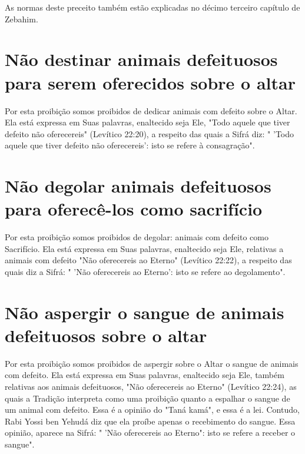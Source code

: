 \begin{itemize}
\begin{enumrate}
\begin{itemize}
\begin{itemize}
\begin{itemize}
As normas deste preceito também estão explicadas no décimo ter­ceiro
capítulo de Zebahim.

\section{Não destinar animais defeituosos para serem oferecidos sobre o altar}

Por esta proibição somos proibidos de dedicar animais com defeito sobre
o Altar. Ela está expressa em Suas palavras, enaltecido seja Ele, "Todo
aquele que tiver defeito não oferecereis" (Levítico 22:20), a respeito
das quais a Sifrá diz: " 'Todo aquele que tiver defeito não
oferecereis': isto se refere à consagração".

\section{Não degolar animais defeituosos para oferecê-los como sacrifício}

Por esta proibição somos proibidos de degolar: animais com defeito como
Sacrifício. Ela está expressa em Suas palavras, enaltecido seja Ele,
relativas a animais com defeito "Não oferecereis ao Eterno" (Levítico
22:22), a respeito das quais diz a Sifrá: " 'Não oferecereis ao Eterno':
isto se refere ao degolamento".


\section{Não aspergir o sangue de animais defeituosos sobre o altar}

Por esta proibição somos proibidos de aspergir sobre o Altar o san­gue
de animais com defeito. Ela está expressa em Suas palavras, enaltecido
seja Ele, também relativas aos animais defeituosos, "Não oferecereis ao
Eterno" (Le­vítico 22:24), as quais a Tradição interpreta como uma
proibição quanto a es­palhar o sangue de um animal com defeito. Essa é a
opinião do "Taná kamá", e essa é a lei. Contudo, Rabi Yossi ben Yehudá
diz que ela proíbe apenas o re­cebimento do sangue. Essa opinião,
aparece na Sifrá: " 'Não oferecereis ao Eter­no": isto se refere a
receber o sangue".


\end{itemize}
\end{itemize}
\end{itemize}
\end{enumrate}
\end{itemize}
